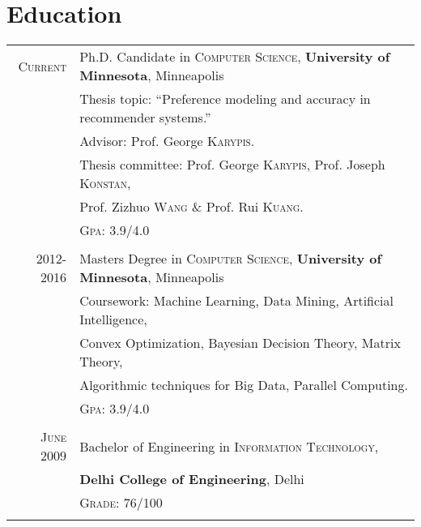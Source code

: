 \documentclass[a4paper,10pt]{article}
\begin{document}
\section{Education}
\begin{tabular}{r|l}	
 \textsc{Current}  & Ph.D. Candidate in \textsc{Computer Science},
  \textbf{University of Minnesota}, Minneapolis\\
 & Thesis topic: ``Preference modeling and accuracy in
  recommender systems.''\\
  & \small Advisor: Prof. George \textsc{Karypis}. \\
  & \small Thesis committee: Prof. George \textsc{Karypis}, Prof. Joseph
  \textsc{Konstan},\\
    & \small Prof. Zizhuo \textsc{Wang} \& Prof. Rui \textsc{Kuang}. \\
  &\normalsize \textsc{Gpa}: 3.9/4.0  \\\multicolumn{2}{c}{}\\

  \textsc{2012-2016} & Masters Degree in \textsc{Computer Science},
  \textbf{University of Minnesota}, Minneapolis \\
                     &Coursework: Machine Learning, Data Mining, Artificial
  Intelligence,  \\
                   &Convex Optimization, Bayesian Decision Theory, Matrix
  Theory, \\ 
  &Algorithmic techniques for Big Data, Parallel Computing. \\
                     &\normalsize \textsc{Gpa}: 3.9/4.0 \\
                   \multicolumn{2}{c}{}\\ %

   
   \textsc{June} 2009& Bachelor of Engineering in \textsc{Information
      Technology}, \\
      &\textbf{Delhi College of Engineering}, Delhi\\
&\textsc{Grade}: 76/100\\ %
\multicolumn{2}{c}{}\\
\end{tabular}
\end{document}
